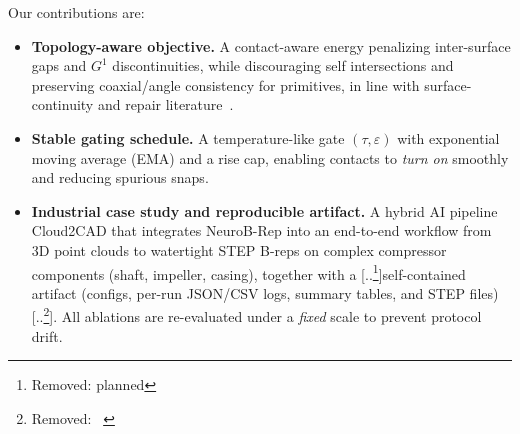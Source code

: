 \documentclass{ieeeaccess}
\providecommand{\DIFdeltex}[1]{{\color{red}[..\footnote{\color{black}Removed: #1}]}} %
\providecommand{\DIFdelbegin}{} %
\providecommand{\DIFdelend}{} %
\providecommand{\DIFdel}[1]{\texorpdfstring{\DIFdeltex{#1}}{}} %
\begin{document}
Our contributions are:
\begin{itemize}
  \item \textbf{Topology-aware objective.} A contact-aware energy penalizing inter-surface gaps and $G^1$ discontinuities, while discouraging self intersections and preserving coaxial/angle consistency for primitives, in line with surface-continuity and repair literature~\cite{b10,b11,b12,b22}.
  \item \textbf{Stable gating schedule.} A temperature-like gate $(\tau,\varepsilon)$ with exponential moving average (EMA) and a rise cap, enabling contacts to \emph{turn on} smoothly and reducing spurious snaps.
  \item \textbf{Industrial case study and reproducible artifact.} A hybrid AI pipeline Cloud2CAD that integrates NeuroB-Rep into an end-to-end workflow from 3D point clouds to watertight STEP B-reps on complex compressor components (shaft, impeller, casing), together with a \DIFdelbegin \DIFdel{planned }\DIFdelend self-contained artifact (configs, per-run JSON/CSV logs, summary tables, and STEP files)\DIFdelbegin \DIFdel{~\cite{b2}}\DIFdelend . All ablations are re-evaluated under a \emph{fixed} scale to prevent protocol drift.
\end{itemize}
\end{document}
